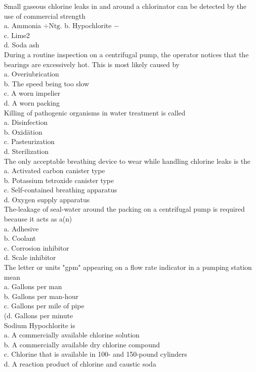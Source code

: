 Small gaseous chlorine leaks in and around a chlorinator can be detected by the use of commercial strength\\
a. Ammonia $\div \mathrm{Ntg}$. 
b. Hypochlorite $-$\\
c. Lime2\\
d. Soda ash\\

During a routine inspection on a centrifugal pump, the operator notices that the bearings are excessively hot. This is most likely caused by\\
a. Overiubrication\\
b. The speed being too slow\\
c. A worn impelier\\
d. A worn packing\\

Killing of pathogenic organisms in water treatment is called\\
a. Disinfection\\
b. Oxidätion\\
c. Pasteurization\\
d. Sterilization\\

The only acceptable breathing device to wear while handling chlorine leaks is the\\
a. Activated carbon canister type\\
b. Potassium tetroxide canister type\\
c. Self-contained breathing apparatus\\
d. Oxygen supply apparatus\\

The-leakage of seal-water around the packing on a centrifugal pump is required because it acts as a(n)\\
a. Adhesive\\
b.  Coolant\\
c. Corrosion inhibitor\\
d. Scale inhibitor\\

The letter or units "gpm" appearing on a flow rate indicator in a pumping station mean\\
a. Gallons per man\\
b. Gallons per man-hour\\
c. Gallons per mile of pipe\\
(d. Gallons per minute\\

Sodium Hypochlorite is\\
a. A commercially available chlorine solution\\
b. A commercially available dry chlorine compound\\
c. Chlorine that is available in 100- and 150-pound cylinders\\
d. A reaction product of chlorine and caustic soda\\

